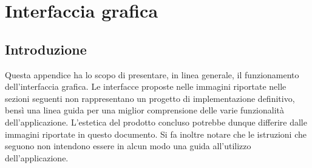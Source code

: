 \appendix	

\chapter{Interfaccia grafica}

\section{Introduzione}

Questa appendice ha lo scopo di presentare, in linea generale, il funzionamento dell'interfaccia grafica. Le interfacce proposte nelle immagini riportate nelle sezioni seguenti non rappresentano un progetto di implementazione definitivo, bensì una linea guida per una miglior comprensione delle varie funzionalità dell'applicazione. L'estetica del prodotto concluso potrebbe dunque differire dalle immagini riportate in questo documento. Si fa inoltre notare che le istruzioni che seguono non intendono essere in alcun modo una guida all'utilizzo dell'applicazione.


